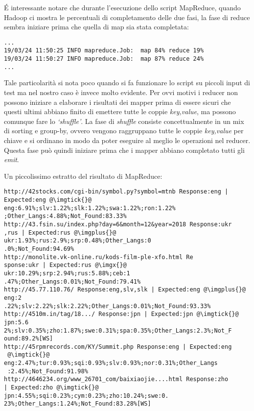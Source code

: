 \documentclass{article}
\newcommand{\MR}{MapReduce}
\begin{document}
\noindent
\'E interessante notare che durante l'esecuzione dello script \MR{}, quando Hadoop ci mostra le percentuali di completamento delle due fasi, la fase di reduce sembra iniziare prima che quella di map sia stata completata:
\begin{verbatim}
...
19/03/24 11:50:25 INFO mapreduce.Job:  map 84% reduce 19%
19/03/24 11:50:27 INFO mapreduce.Job:  map 87% reduce 24%
...
\end{verbatim}
Tale particolarità si nota poco quando si fa funzionare lo script su piccoli input di test ma nel nostro caso è invece molto evidente. Per ovvi motivi i reducer non possono iniziare a elaborare i risultati dei mapper prima di essere sicuri che questi ultimi abbiano finito di emettere tutte le coppie \textit{\textlangle key,value\textrangle}, ma possono comunque fare lo \textit{`shuffle'}.
La fase di \textit{shuffle} consiste concettualmente in un mix di sorting e group-by, ovvero vengono raggruppano tutte le coppie \textit{\textlangle key,value\textrangle} per chiave e si ordinano in modo da poter eseguire al meglio le operazioni nel reducer. Questa fase può quindi iniziare prima che i mapper abbiano completato tutti gli \textit{emit}.

Un piccolissimo estratto del risultato di \MR{}:
\begin{verbatim}
http://42stocks.com/cgi-bin/symbol.py?symbol=mtnb Response:eng |
Expected:eng @\imgtick{}@ eng:6.91%;slv:1.22%;slk:1.22%;swa:1.22%;ron:1.22%
;Other_Langs:4.88%;Not_Found:83.33%
http://43.fsin.su/index.php?day=6&month=12&year=2018 Response:ukr
,rus | Expected:rus @\imgplus{}@ ukr:1.93%;rus:2.9%;srp:0.48%;Other_Langs:0
.0%;Not_Found:94.69%
http://monolite.vk-online.ru/kods-film-ple-xfo.html Re
sponse:ukr | Expected:rus @\imgx{}@ ukr:10.29%;srp:2.94%;rus:5.88%;ceb:1
.47%;Other_Langs:0.01%;Not_Found:79.41%
http://45.77.110.76/ Response:eng,slv,slk | Expected:eng @\imgplus{}@ eng:2
.22%;slv:2.22%;slk:2.22%;Other_Langs:0.01%;Not_Found:93.33%
http://4510m.in/tag/18.../ Response:jpn | Expected:jpn @\imgtick{}@ jpn:5.6
2%;slv:0.35%;zho:1.87%;swe:0.31%;spa:0.35%;Other_Langs:2.3%;Not_F
ound:89.2%[WS]
http://45rpmrecords.com/KY/Summit.php Response:eng | Expected:eng
 @\imgtick{}@ eng:2.47%;tur:0.93%;sqi:0.93%;slv:0.93%;nor:0.31%;Other_Langs
 :2.45%;Not_Found:91.98%
http://4646234.org/www_26701_com/baixiaojie....html Response:zho 
| Expected:zho @\imgtick{}@ jpn:4.55%;sqi:0.23%;cym:0.23%;zho:10.24%;swe:0.
23%;Other_Langs:1.24%;Not_Found:83.28%[WS]
\end{verbatim}
\end{document}
